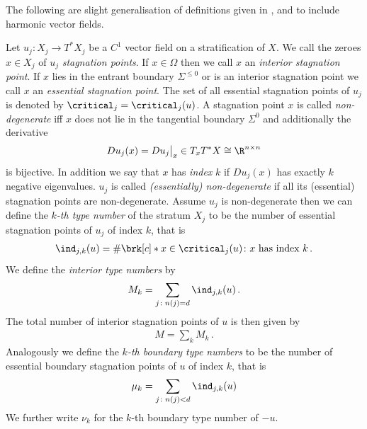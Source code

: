 The following are slight generalisation of definitions given in \cite[p.138f]{Shelton1980}, \cite[§5]{Morse1969} and \cite[p.282f]{Morse1970}
to include harmonic vector fields.
\begin{definition}\label{df:nonDegeneracy}
  Let $u_j\colon X_j\to T^*X_j$ be a $C^1$ vector field on a stratification of $X$.
  We call the zeroes $x\in X_j$ of $u_j$ \emph{stagnation points}.
  If $x\in\Omega$ then we call $x$ an \emph{interior stagnation point}.
  If $x$ lies in the entrant boundary $\Sigma^{\leq0}$ or is an interior stagnation point we call $x$ an \emph{essential stagnation point}.
  The set of all essential stagnation points of $u_j$ is denoted by $\critical_j=\critical_j(u)$.
  A stagnation point $x$ is called
  \emph{non-degenerate} iff $x$ does not lie in the tangential boundary $\Sigma^0$ 
  and additionally the derivative
  \begin{align*}
    Du_j(x)=Du_j\big\vert_x\in T_xT^*X\cong \R^{n\times n}
  \end{align*}
  is bijective.
  In addition we say that $x$ has \emph{index} $k$
  if $Du_j(x)$ has exactly $k$ negative eigenvalues.
  $u_j$ is called \emph{(essentially) non-degenerate} if all its (essential) stagnation points
  are non-degenerate. 
  Assume $u_j$ is non-degenerate then we can define the \emph{$k$-th type number} of the
  stratum $X_j$ to be the number of essential stagnation points of $u_j$ of index $k$,
  that is
  \begin{align*}
    \ind_{j,k}(u)=\#\brk[c]*{x\in\critical_j(u)\colon x\text{ has index }k}\,.
  \end{align*}
  We define the \emph{interior type numbers} by
  \begin{align*}
    M_k=\sum_{j\colon n(j)=d}\ind_{j,k}(u)\,.
  \end{align*}
  The total number of interior
  stagnation points of $u$ is then given by
  \begin{align*}
    M=\sum_kM_k\,.
  \end{align*}
  Analogously we define the \emph{$k$-th boundary type numbers} to be the number of essential boundary 
  stagnation points of $u$ of index $k$, that is
  \begin{align}
    \mu_k=\sum_{j\colon n(j)<d}\ind_{j,k}(u)\label{eq:bdTypeNbrs}
  \end{align}
  We further write $\nu_k$ for the $k$-th boundary type number of $-u$.
\end{definition}

